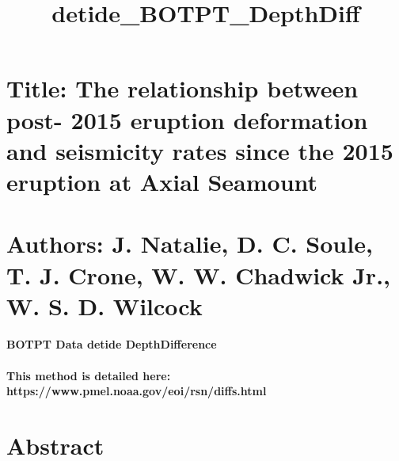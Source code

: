 \documentclass[11pt]{article}
\title{detide\_BOTPT\_DepthDiff}
\begin{document}
    
    
    \maketitle
    
    

    
    \hypertarget{title-the-relationship-between-post--2015-eruption-deformation-and-seismicity-rates-since-the-2015-eruption-at-axial-seamount}{%
\section{Title: The relationship between post- 2015 eruption deformation
and seismicity rates since the 2015 eruption at Axial
Seamount}\label{title-the-relationship-between-post--2015-eruption-deformation-and-seismicity-rates-since-the-2015-eruption-at-axial-seamount}}

\hypertarget{authors-j.-natalie-d.-c.-soule-t.-j.-crone-w.-w.-chadwick-jr.-w.-s.-d.-wilcock}{%
\section{Authors: J. Natalie, D. C. Soule, T. J. Crone, W. W. Chadwick
Jr., W. S. D.
Wilcock}\label{authors-j.-natalie-d.-c.-soule-t.-j.-crone-w.-w.-chadwick-jr.-w.-s.-d.-wilcock}}

\hypertarget{botpt-data-detide-depthdifference}{%
\paragraph{BOTPT Data detide
DepthDifference}\label{botpt-data-detide-depthdifference}}

\hypertarget{this-method-is-detailed-here-httpswww.pmel.noaa.goveoirsndiffs.html}{%
\paragraph{This method is detailed here:
https://www.pmel.noaa.gov/eoi/rsn/diffs.html}\label{this-method-is-detailed-here-httpswww.pmel.noaa.goveoirsndiffs.html}}

    \hypertarget{abstract}{%
\section{Abstract}\label{abstract}}
\end{document}
